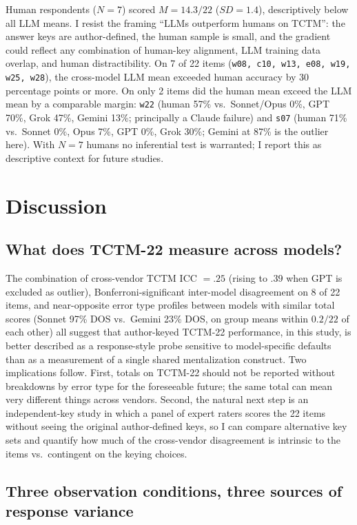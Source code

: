 \documentclass[11pt,a4paper]{article}
\begin{document}
Human respondents ($N = 7$) scored $M = 14.3 / 22$ ($SD = 1.4$), descriptively below all LLM means. I resist the framing ``LLMs outperform humans on TCTM'': the answer keys are author-defined, the human sample is small, and the gradient could reflect any combination of human-key alignment, LLM training data overlap, and human distractibility. On 7 of 22 items (\texttt{w08, c10, w13, e08, w19, w25, w28}), the cross-model LLM mean exceeded human accuracy by 30 percentage points or more. On only 2 items did the human mean exceed the LLM mean by a comparable margin: \texttt{w22} (human 57\% vs.\ Sonnet/Opus 0\%, GPT 70\%, Grok 47\%, Gemini 13\%; principally a Claude failure) and \texttt{s07} (human 71\% vs.\ Sonnet 0\%, Opus 7\%, GPT 0\%, Grok 30\%; Gemini at 87\% is the outlier here). With $N = 7$ humans no inferential test is warranted; I report this as descriptive context for future studies.

\section{Discussion}

\subsection{What does TCTM-22 measure across models?}

The combination of cross-vendor TCTM ICC $= .25$ (rising to $.39$ when GPT is excluded as outlier), Bonferroni-significant inter-model disagreement on 8 of 22 items, and near-opposite error type profiles between models with similar total scores (Sonnet 97\% DOS vs.\ Gemini 23\% DOS, on group means within $0.2 / 22$ of each other) all suggest that author-keyed TCTM-22 performance, in this study, is better described as a response-style probe sensitive to model-specific defaults than as a measurement of a single shared mentalization construct. Two implications follow. First, totals on TCTM-22 should not be reported without breakdowns by error type for the foreseeable future; the same total can mean very different things across vendors. Second, the natural next step is an independent-key study in which a panel of expert raters scores the 22 items without seeing the original author-defined keys, so I can compare alternative key sets and quantify how much of the cross-vendor disagreement is intrinsic to the items vs.\ contingent on the keying choices.

\subsection{Three observation conditions, three sources of response variance}
\end{document}
